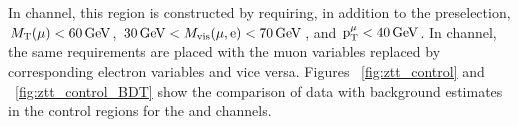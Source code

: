 In \Hmue channel, this region is constructed by requiring, in addition to the preselection, $M_\mathrm{T}(\mu) < 60\,\text{Ge\hspace{-.08em}V}$, $30\,\text{Ge\hspace{-.08em}V} < M_{\text{vis}}(\mu, \text{e}) < 70\,\text{Ge\hspace{-.08em}V}$, and $\text{p}_\text{T}^{\mu} < 40\,\text{Ge\hspace{-.08em}V}$. In \Hemu channel, the same requirements are placed with the muon variables replaced by corresponding electron variables and vice versa. Figures ~\ref{fig:ztt_control} and ~\ref{fig:ztt_control_BDT} show the comparison of data with background estimates in the \Ztt control regions for the \Hmt and \Het channels.

\begin{figure}[htbp!]
  \centering

\end{figure}

